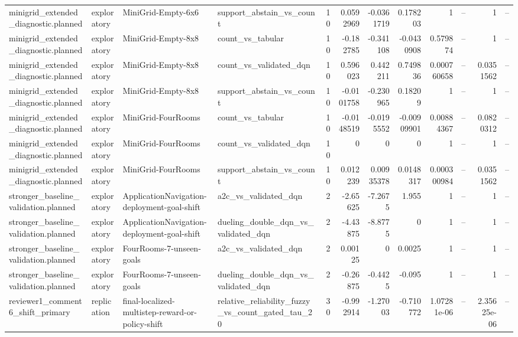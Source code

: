 \begin{longtable}{llllrrrrrrrr}
minigrid\_extended\_diagnostic.planned & exploratory & MiniGrid-Empty-6x6 & support\_abstain\_vs\_count & 10 & 0.0592969 & -0.0361719 & 0.178203 & 1 & -- & 1 & -- \\
minigrid\_extended\_diagnostic.planned & exploratory & MiniGrid-Empty-8x8 & count\_vs\_tabular & 10 & -0.182785 & -0.341108 & -0.0430908 & 0.579874 & -- & 1 & -- \\
minigrid\_extended\_diagnostic.planned & exploratory & MiniGrid-Empty-8x8 & count\_vs\_validated\_dqn & 10 & 0.596023 & 0.442211 & 0.749836 & 0.000760658 & -- & 0.0351562 & -- \\
minigrid\_extended\_diagnostic.planned & exploratory & MiniGrid-Empty-8x8 & support\_abstain\_vs\_count & 10 & -0.0101758 & -0.230965 & 0.18209 & 1 & -- & 1 & -- \\
minigrid\_extended\_diagnostic.planned & exploratory & MiniGrid-FourRooms & count\_vs\_tabular & 10 & -0.0148519 & -0.0195552 & -0.00909901 & 0.00884367 & -- & 0.0820312 & -- \\
minigrid\_extended\_diagnostic.planned & exploratory & MiniGrid-FourRooms & count\_vs\_validated\_dqn & 10 & 0 & 0 & 0 & 1 & -- & 1 & -- \\
minigrid\_extended\_diagnostic.planned & exploratory & MiniGrid-FourRooms & support\_abstain\_vs\_count & 10 & 0.012239 & 0.00935378 & 0.0148317 & 0.000300984 & -- & 0.0351562 & -- \\
stronger\_baseline\_validation.planned & exploratory & ApplicationNavigation-deployment-goal-shift & a2c\_vs\_validated\_dqn & 2 & -2.65625 & -7.2675 & 1.955 & 1 & -- & 1 & -- \\
stronger\_baseline\_validation.planned & exploratory & ApplicationNavigation-deployment-goal-shift & dueling\_double\_dqn\_vs\_validated\_dqn & 2 & -4.43875 & -8.8775 & 0 & 1 & -- & 1 & -- \\
stronger\_baseline\_validation.planned & exploratory & FourRooms-7-unseen-goals & a2c\_vs\_validated\_dqn & 2 & 0.00125 & 0 & 0.0025 & 1 & -- & 1 & -- \\
stronger\_baseline\_validation.planned & exploratory & FourRooms-7-unseen-goals & dueling\_double\_dqn\_vs\_validated\_dqn & 2 & -0.26875 & -0.4425 & -0.095 & 1 & -- & 1 & -- \\
reviewer1\_comment6\_shift\_primary & replication & final-localized-multistep-reward-or-policy-shift & relative\_reliability\_fuzzy\_vs\_count\_gated\_tau\_20 & 30 & -0.992914 & -1.27003 & -0.710772 & 1.07281e-06 & -- & 2.35625e-06 & -- \\

\end{longtable}
